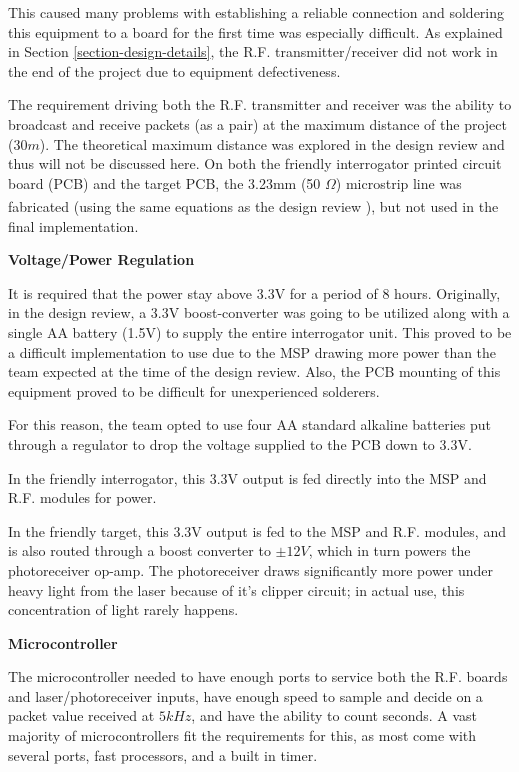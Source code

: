 \documentclass[letterpaper,10pt]{article}
\begin{document}
\begin{spacing}{1.15}
This caused many problems with establishing a reliable connection and soldering this equipment to a board for the first time was especially difficult. As explained in Section \ref{section-design-details}, the R.F. transmitter/receiver did not work in the end of the project due to equipment defectiveness.

The requirement driving both the R.F. transmitter and receiver was the ability to broadcast and receive packets (as a pair) at the maximum distance of the project ($30m$). The theoretical maximum distance was explored in the design review and thus will not be discussed here. On both the friendly interrogator printed circuit board (PCB) and the target PCB, the 3.23mm (50 $\Omega$) microstrip line was fabricated (using the same equations as the design review \textsuperscript{\cite{Microstrip}}), but not used in the final implementation.


\hspace{5mm}\textbf{Voltage/Power Regulation} \label{section:interrogator-voltage-regulation-design-procedure}

It is required that the power stay above 3.3V for a period of 8 hours. Originally, in the design review, a 3.3V boost-converter was going to be utilized along with a single AA battery (1.5V) to supply the entire interrogator unit. This proved to be a difficult implementation to use due to the MSP drawing more power than the team expected at the time of the design review. Also, the PCB mounting of this equipment proved to be difficult for unexperienced solderers. 

For this reason, the team opted to use four AA standard alkaline batteries put through a regulator to drop the voltage supplied to the PCB down to 3.3V. 

In the friendly interrogator, this 3.3V output is fed directly into the MSP and R.F. modules for power.

In the friendly target, this 3.3V output is fed to the MSP and R.F. modules, and is also routed through a boost converter to $\pm 12V$, which in turn powers the photoreceiver op-amp. The photoreceiver draws significantly more power under heavy light from the laser because of it's clipper circuit; in actual use, this concentration of light rarely happens. 

 
\hspace{5mm}\textbf{Microcontroller} \label{section:system-design-procedure}

The microcontroller needed to have enough ports to service both the R.F. boards and laser/photoreceiver inputs, have enough speed to sample and decide on a packet value received at $5kHz$, and have the ability to count seconds. A vast majority of microcontrollers fit the requirements for this, as most come with several ports, fast processors, and a built in timer.


\end{spacing}
\end{document}
